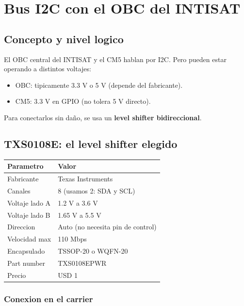 \documentclass[11pt,a4paper,oneside,openright]{book}
\begin{document}
\chapter{Bus I2C con el OBC del INTISAT}
\label{ch:i2c}

\section{Concepto y nivel logico}

El OBC central del INTISAT y el CM5 hablan por I2C. Pero pueden estar
operando a distintos voltajes:

\begin{itemize}[leftmargin=2em]
  \item OBC: tipicamente 3.3 V o 5 V (depende del fabricante).
  \item CM5: 3.3 V en GPIO (no tolera 5 V directo).
\end{itemize}

Para conectarlos sin daño, se usa un \textbf{level shifter bidireccional}.

\section{TXS0108E: el level shifter elegido}

\begin{center}
\begin{tabular}{ll}
\toprule
\textbf{Parametro} & \textbf{Valor} \\
\midrule
Fabricante           & Texas Instruments \\
Canales              & 8 (usamos 2: SDA y SCL) \\
Voltaje lado A       & 1.2 V a 3.6 V \\
Voltaje lado B       & 1.65 V a 5.5 V \\
Direccion            & Auto (no necesita pin de control) \\
Velocidad max        & 110 Mbps \\
Encapsulado          & TSSOP-20 o WQFN-20 \\
Part number          & TXS0108EPWR \\
Precio               & USD 1 \\
\bottomrule
\end{tabular}
\end{center}

\subsection{Conexion en el carrier}
\end{document}
